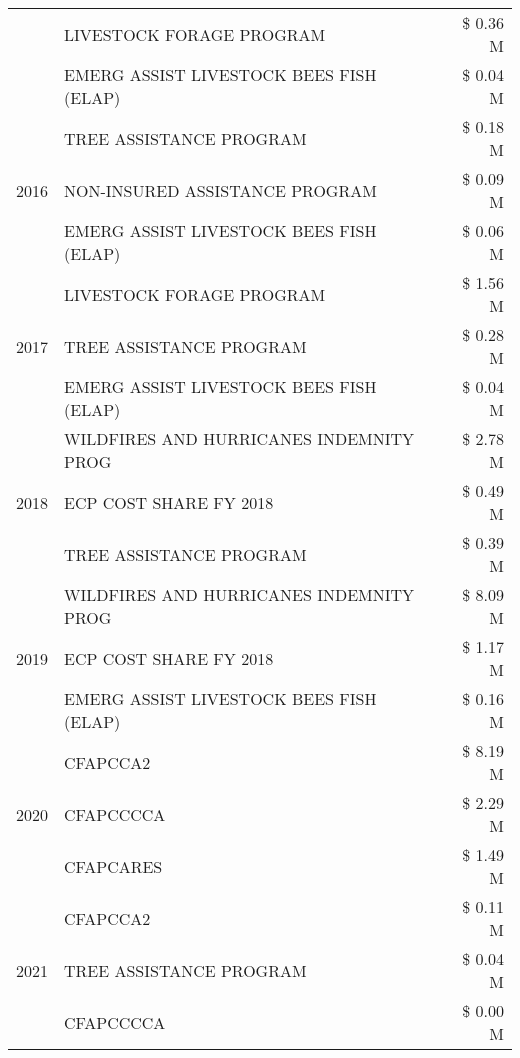 \begin{tabular}{llr}
 & LIVESTOCK FORAGE PROGRAM & \$ 0.36 M \\
 & EMERG ASSIST LIVESTOCK BEES FISH (ELAP) & \$ 0.04 M \\
\cline{1-3}
\multirow[t]{3}{*}{2016} & TREE ASSISTANCE PROGRAM                       & \$ 0.18 M \\
 & NON-INSURED ASSISTANCE PROGRAM                & \$ 0.09 M \\
 & EMERG ASSIST LIVESTOCK BEES FISH (ELAP)       & \$ 0.06 M \\
\cline{1-3}
\multirow[t]{3}{*}{2017} & LIVESTOCK FORAGE PROGRAM & \$ 1.56 M \\
 & TREE ASSISTANCE PROGRAM & \$ 0.28 M \\
 & EMERG ASSIST LIVESTOCK BEES FISH (ELAP) & \$ 0.04 M \\
\cline{1-3}
\multirow[t]{3}{*}{2018} & WILDFIRES AND HURRICANES INDEMNITY PROG & \$ 2.78 M \\
 & ECP COST SHARE FY 2018 & \$ 0.49 M \\
 & TREE ASSISTANCE PROGRAM & \$ 0.39 M \\
\cline{1-3}
\multirow[t]{3}{*}{2019} & WILDFIRES AND HURRICANES INDEMNITY PROG & \$ 8.09 M \\
 & ECP COST SHARE FY 2018 & \$ 1.17 M \\
 & EMERG ASSIST LIVESTOCK BEES FISH (ELAP) & \$ 0.16 M \\
\cline{1-3}
\multirow[t]{3}{*}{2020} & CFAPCCA2 & \$ 8.19 M \\
 & CFAPCCCCA & \$ 2.29 M \\
 & CFAPCARES & \$ 1.49 M \\
\cline{1-3}
\multirow[t]{3}{*}{2021} & CFAPCCA2 & \$ 0.11 M \\
 & TREE ASSISTANCE PROGRAM & \$ 0.04 M \\
 & CFAPCCCCA & \$ 0.00 M \\
\cline{1-3}
\bottomrule
\end{tabular}

